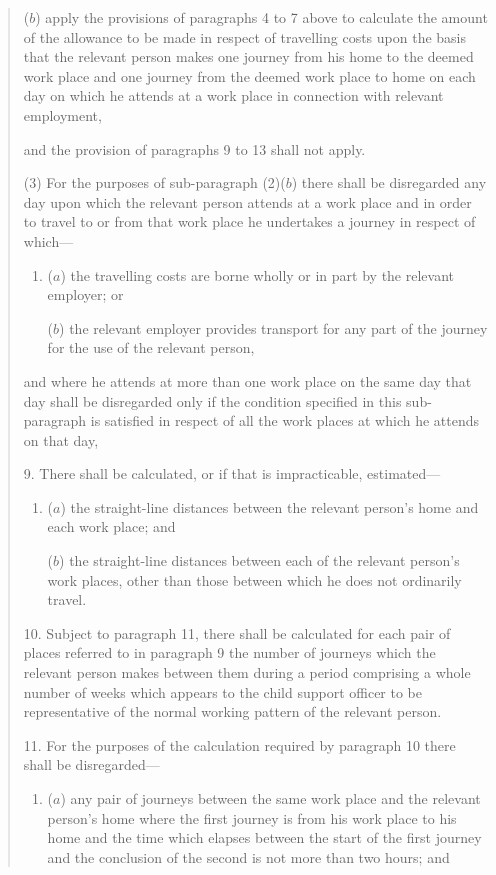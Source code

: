 \documentclass[12pt,a4paper]{article}
\begin{document}
\begin{quotation}
\begin{enumerate}
($b$) apply the provisions of paragraphs 4 to 7 above to calculate the amount of the allowance to be made in respect of travelling costs upon the basis that the relevant person makes one journey from his home to the deemed work place and one journey from the deemed work place to home on each day on which he attends at a work place in connection with relevant employment,
\end{enumerate}
and the provision of paragraphs 9 to 13 shall not apply.

(3) For the purposes of sub-paragraph (2)($b$) there shall be disregarded any day upon which the relevant person attends at a work place and in order to travel to or from that work place he undertakes a journey in respect of which—
\begin{enumerate}\item[]
($a$) the travelling costs are borne wholly or in part by the relevant employer; or

($b$) the relevant employer provides transport for any part of the journey for the use of the relevant person,
\end{enumerate}
and where he attends at more than one work place on the same day that day shall be disregarded only if the condition specified in this sub-paragraph is satisfied in respect of all the work places at which he attends on that day,

\medskip

9.  There shall be calculated, or if that is impracticable, estimated—
\begin{enumerate}\item[]
($a$) the straight-line distances between the relevant person’s home and each work place; and

($b$) the straight-line distances between each of the relevant person’s work places, other than those between which he does not ordinarily travel.
\end{enumerate}

\medskip

10.  Subject to paragraph 11, there shall be calculated for each pair of places referred to in paragraph 9 the number of journeys which the relevant person makes between them during a period comprising a whole number of weeks which appears to the child support officer to be representative of the normal working pattern of the relevant person.

\medskip

11.  For the purposes of the calculation required by paragraph 10 there shall be disregarded—
\begin{enumerate}\item[]
($a$) any pair of journeys between the same work place and the relevant person’s home where the first journey is from his work place to his home and the time which elapses between the start of the first journey and the conclusion of the second is not more than two hours; and


\end{enumerate}
\end{quotation}
\end{document}
